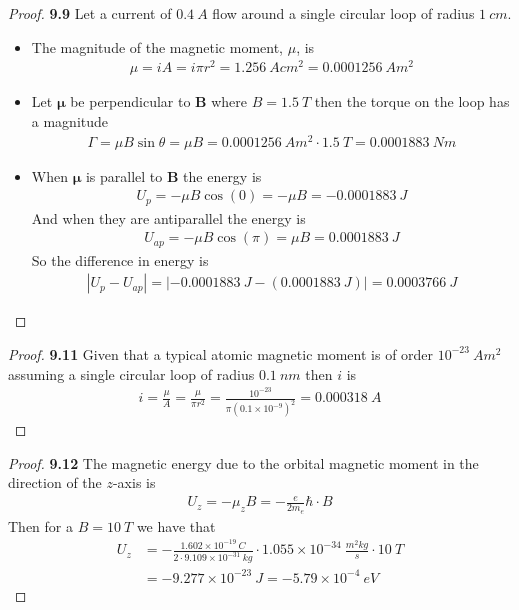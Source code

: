 \documentclass[11pt]{article}
\newcommand{\sci}[1]{\times 10^{#1}}
\theoremstyle{definition}
\begin{document}
\cleardoublepage
\begin{proof}{\textbf{9.9}}
Let a current of $0.4~A$ flow around a single circular loop of radius $1~cm$.
\begin{itemize}
\item [\textbf{(a)}] The magnitude of the magnetic moment, $\mu$, is
\begin{align*}
    \mu = iA = i \pi r^2 = 1.256~A cm^2 = 0.0001256~A m^2
\end{align*}
\item [\textbf{(b)}] Let $\bm\mu$ be perpendicular to $\bm{B}$ where $B = 1.5~T$
then the torque on the loop has a magnitude
\begin{align*}
    \Gamma = \mu B\sin \theta = \mu B = 0.0001256~A m^2 \cdot 1.5~T
    = 0.0001883~Nm
\end{align*}
\item [\textbf{(c)}] When $\bm{\mu}$ is parallel to $\bm{B}$ the energy is
\begin{align*}
    U_p = -\mu B\cos(0) = -\mu B = -0.0001883~J
\end{align*}
And when they are antiparallel the energy is
\begin{align*}
    U_{ap} = -\mu B\cos(\pi) = \mu B = 0.0001883~J
\end{align*}
So the difference in energy is
\begin{align*}
    |U_p - U_{ap}| = |-0.0001883~J - (0.0001883~J)| = 0.0003766~J
\end{align*}
\end{itemize}
\end{proof}

\cleardoublepage
\begin{proof}{\textbf{9.11}}
Given that a typical atomic magnetic moment is of order $10^{-23}~Am^2$
assuming a single circular loop of radius $0.1~nm$ then $i$ is
\begin{align*}
    i = \frac{\mu}{A} = \frac{\mu}{\pi r^2}
    = \frac{10^{-23}}{\pi(0.1\sci{-9})^2}
    = 0.000318~A
\end{align*}
\end{proof}
\begin{proof}{\textbf{9.12}}
The magnetic energy due to the orbital magnetic moment in the direction of the
$z$-axis is
\begin{align*}
    U_z = -\mu_z B = - \frac{e}{2m_e}\hbar \cdot B
\end{align*}
Then for a $B = 10~T$ we have that
\begin{align*}
    U_z &= - \frac{1.602\sci{-19}~C}{2\cdot 9.109\sci{-31}~kg}
    \cdot 1.055 \sci{-34}~\frac{m^2kg}{s}\cdot 10~T\\
    &= -9.277\sci{-23}~J = -5.79\sci{-4}~eV
\end{align*}
\end{proof}
\end{document}

